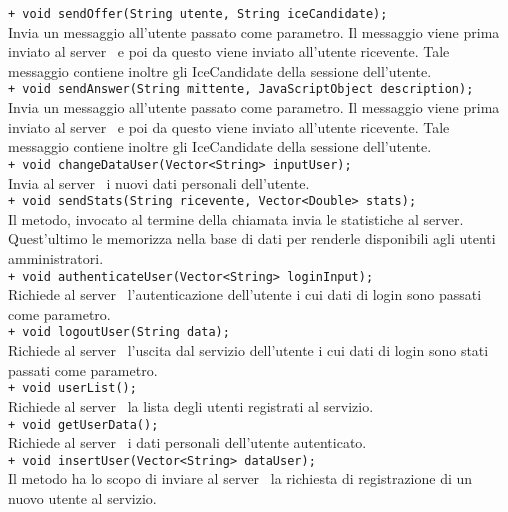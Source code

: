 {{\begin{sloppypar}
{{\begin{itemize}
{					\texttt{+ void sendOffer(String utente, String iceCandidate);}\\
					Invia un messaggio all'utente passato come parametro. Il messaggio viene prima inviato al server\g~ e poi da questo viene inviato all'utente ricevente. Tale messaggio contiene inoltre gli IceCandidate della sessione dell'utente.\\

					\texttt{+ void sendAnswer(String mittente, JavaScriptObject description);}\\
					Invia un messaggio all'utente passato come parametro. Il messaggio viene prima inviato al server\g~ e poi da questo viene inviato all'utente ricevente. Tale messaggio contiene inoltre gli IceCandidate della sessione dell'utente.\\

					\texttt{+ void changeDataUser(Vector<String> inputUser);}\\
					Invia al server\g~ i nuovi dati personali dell'utente.\\

					\texttt{+ void sendStats(String ricevente, Vector<Double> stats);}\\
					Il metodo, invocato al termine della chiamata invia le statistiche al server\g. Quest'ultimo le memorizza nella base di dati per renderle disponibili agli utenti amministratori.\\

					\texttt{+ void authenticateUser(Vector<String> loginInput);}\\
					Richiede al server\g~ l'autenticazione dell'utente i cui dati di login sono passati come parametro.\\

					\texttt{+ void logoutUser(String data);}\\
					Richiede al server\g~ l'uscita dal servizio dell'utente i cui dati di login sono stati passati come parametro.\\

					\texttt{+ void userList();}\\
					Richiede al server\g~ la lista degli utenti registrati al servizio.\\

					\texttt{+ void getUserData();}\\
					Richiede al server\g~ i dati personali dell'utente autenticato.\\
					
					\texttt{+ void insertUser(Vector<String> dataUser);}\\
					Il metodo ha lo scopo di inviare al server\g~ la richiesta di registrazione di un nuovo utente al servizio.\\
					
}
\end{itemize}}}
\end{sloppypar}}}
